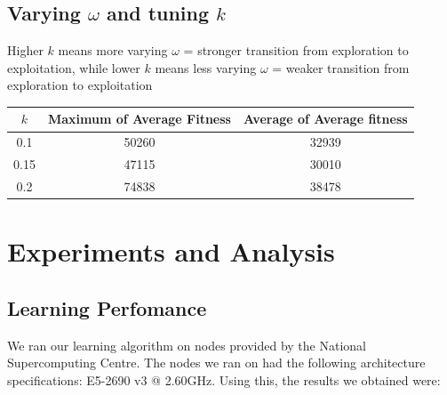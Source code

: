 \documentclass{article}
\begin{document}
\subsection{Varying $\omega$ and tuning $k$}
Higher $k$ means more varying $\omega$ = stronger transition from exploration
to exploitation, while lower $k$ means less varying $\omega$ = weaker
transition from exploration to exploitation

\begin{center}
\begin{tabular}{ | c | c | c | }
	\hline
	$k$ & Maximum of Average Fitness & Average of Average fitness \\ \hline
	0.1 & 50260 & 32939 \\ \hline
	0.15 & 47115 & 30010 \\ \hline
	0.2 & 74838 & 38478 \\ \hline
\end{tabular}
\end{center}

\section{Experiments and Analysis}

\subsection{Learning Perfomance}
We ran our learning algorithm on nodes provided by the National Supercomputing
Centre.  The nodes we ran on had the following architecture specifications:
E5-2690 v3 @ 2.60GHz.  Using this, the results we obtained were:
\end{document}

